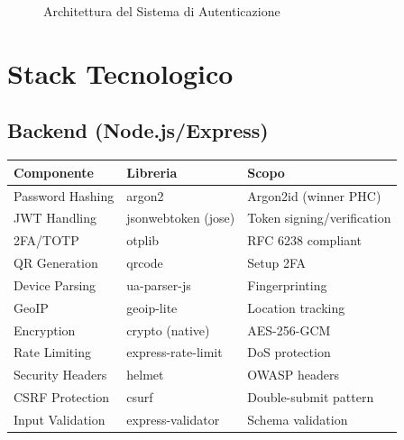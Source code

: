 \documentclass[12pt,a4paper]{report}
\begin{document}
\begin{figure}[H]
    \caption{Architettura del Sistema di Autenticazione}
    \label{fig:architecture}
\end{figure}

\section{Stack Tecnologico}

\subsection{Backend (Node.js/Express)}

\begin{longtable}{@{}p{4cm}p{5cm}p{5cm}@{}}
\toprule
\textbf{Componente} & \textbf{Libreria} & \textbf{Scopo} \\
\midrule
\endhead
Password Hashing & argon2 & Argon2id (winner PHC) \\
JWT Handling & jsonwebtoken (jose) & Token signing/verification \\
2FA/TOTP & otplib & RFC 6238 compliant \\
QR Generation & qrcode & Setup 2FA \\
Device Parsing & ua-parser-js & Fingerprinting \\
GeoIP & geoip-lite & Location tracking \\
Encryption & crypto (native) & AES-256-GCM \\
Rate Limiting & express-rate-limit & DoS protection \\
Security Headers & helmet & OWASP headers \\
CSRF Protection & csurf & Double-submit pattern \\
Input Validation & express-validator & Schema validation \\
\bottomrule
\end{longtable}
\end{document}
